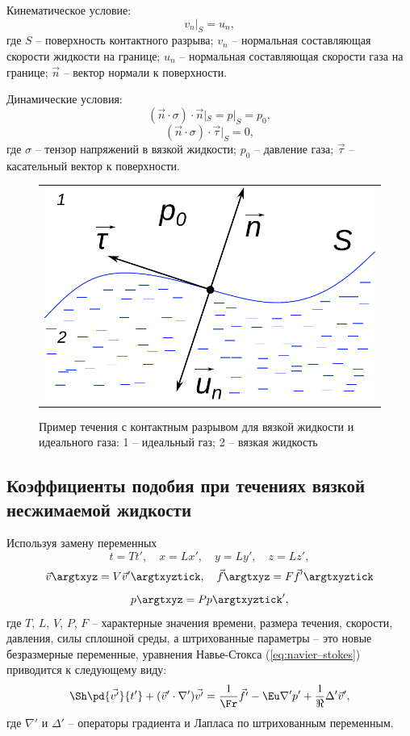 \documentclass[14pt]{extarticle}
\begin{document}
\alert{Кинематическое} условие:
\[
v_n|_S = u_n,
\]
где $S$ -- поверхность контактного разрыва; $v_n$ -- нормальная составляющая скорости жидкости на границе; $u_n$ -- нормальная составляющая скорости газа на границе; $\vec{n}$ -- вектор нормали к поверхности.

\alert{Динамические} условия:
\[
(\vec{n}\cdot\sigma)\cdot\vec{n}|_S= p|_S = p_0,
\]
\[
(\vec{n}\cdot\sigma)\cdot\vec{\tau}|_S = 0,
\]
где $\sigma$ -- тензор напряжений в вязкой жидкости; $p_0$ -- давление газа; $\vec{\tau}$ -- касательный вектор к поверхности.

\begin{figure}
	\centering
	\begin{tabular}{c}
		\includegraphics[width=0.6\linewidth]{../img/free_bound} \\
	\end{tabular}
	\caption{Пример течения с контактным разрывом для вязкой жидкости и идеального газа: 1 -- идеальный газ; 2 -- вязкая жидкость}
	\label{fig:viscous_fluid_gas}
	
\end{figure}	

\subsection{Коэффициенты подобия при течениях вязкой несжимаемой жидкости}

Используя замену переменных 
\[
t = T t',\quad
x = L x',\quad 
y = L y',\quad
z = L z',			
\]
\[
\vec{v}\argtxyz = V \vec{v}'\argtxyztick,\quad
\vec{f}\argtxyz = F \vec{f}'\argtxyztick
\]
\[
p\argtxyz = P p\argtxyztick',
\]
где $T$, $L$, $V$, $P$, $F$ -- характерные значения времени, размера течения, скорости, давления, силы сплошной среды, а штрихованные параметры -- это новые безразмерные переменные, уравнения Навье-Стокса (\ref{eq:navier–stokes}) приводится к следующему виду:
\begin{equation}
\label{eq:Navier-Stokes_dim}
\Sh\pd{\vec{v'}}{t'} + (\vec{v}' \cdot \nabla') \vec{v'} = \frac{1}{\Fr} \vec{f'}  - \Eu \nabla' p' + 
\frac{1}{\Re} \Delta' \vec{v}',
\end{equation}
где $\nabla'$ и $\Delta'$ -- операторы градиента и Лапласа по штрихованным переменным.
\end{document}
